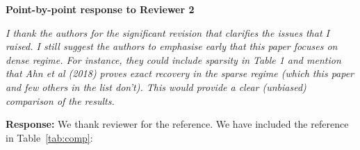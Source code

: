 \documentclass[11pt]{article}
\theoremstyle{definition}
\theoremstyle{definition}
\begin{document}
\begin{enumerate}
\begin{enumerate}[wide]
\begin{itemize}
        
    \end{itemize}
    \end{enumerate} 
    
    
\end{enumerate}

\newpage
\begin{center}
    \textbf{Point-by-point response to Reviewer 2}
\end{center}

\textit{I thank the authors for the signiﬁcant revision that clariﬁes the issues that I raised. I still suggest the authors to emphasise early that this paper focuses on dense regime. For instance, they could include sparsity in Table 1 and mention that Ahn et al (2018) proves exact recovery in the sparse regime (which this paper and few others in the list don't). This would provide a clear (unbiased) comparison of the results.}

\textbf{Response:} We thank reviewer for the reference. We have included the reference \cite{ahn2018hypergraph} in Table~\ref{tab:comp}:

\begin{quote}
    \begin{table*}[ht]
    \caption{ Comparison between previous methods with our method. $^*$We list the result for order-K tensors with $K \geq 3$ and general number of communities $r = \tO(1)$. $^{**}$The parameter $\alpha = f(p) > 0$ denotes the sparsity level which is some function of dimension $p$. }
\end{table*}
\end{quote}
\end{document}
